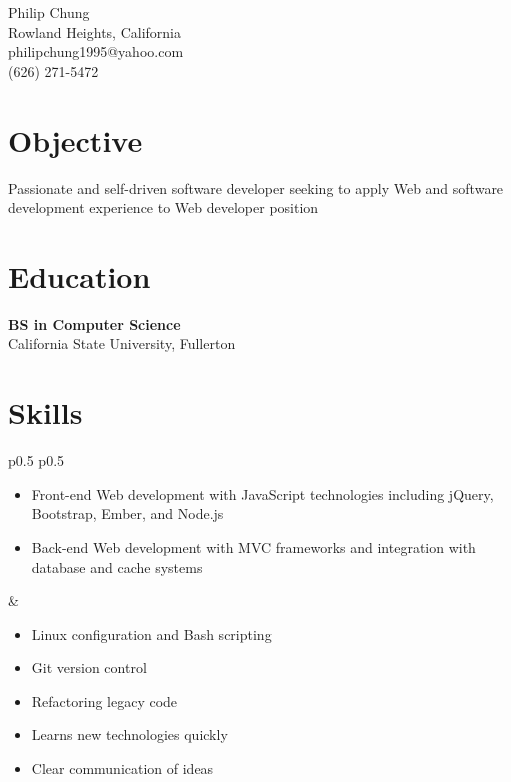 \documentclass[10pt]{article}
\newcommand{\baseheader}[3]{#1 \marginpar{\raggedleft #2} \\ #3}
\begin{document}
	\begin{center}
		{\LARGE Philip Chung} \\
		Rowland Heights, California \\
		philipchung1995@yahoo.com \\
		(626) 271-5472 \\
	\end{center}

	\section*{Objective}

	Passionate and self-driven software developer seeking to apply Web and software development experience to Web developer position

	\section*{Education}

	\baseheader{\textbf{BS in Computer Science}}{1/2018}{California State University, Fullerton}

	\section*{Skills}

	\begin{tabular}{p{0.5\textwidth} p{0.5\textwidth}}
		\begin{minipage}[t]{\linewidth}
			\raggedright
			\begin{itemize}[nosep]
				\item Front-end Web development with JavaScript technologies including jQuery, Bootstrap, Ember, and Node.js
				\item Back-end Web development with MVC frameworks and integration with database and cache systems
			\end{itemize}
		\end{minipage}
		&
		\begin{minipage}[t]{\linewidth}
			\raggedright
			\begin{itemize}[nosep]
				\item Linux configuration and Bash scripting
				\item Git version control
				\item Refactoring legacy code
				\item Learns new technologies quickly
				\item Clear communication of ideas
			\end{itemize}
		\end{minipage}
	\end{tabular}
\end{document}
